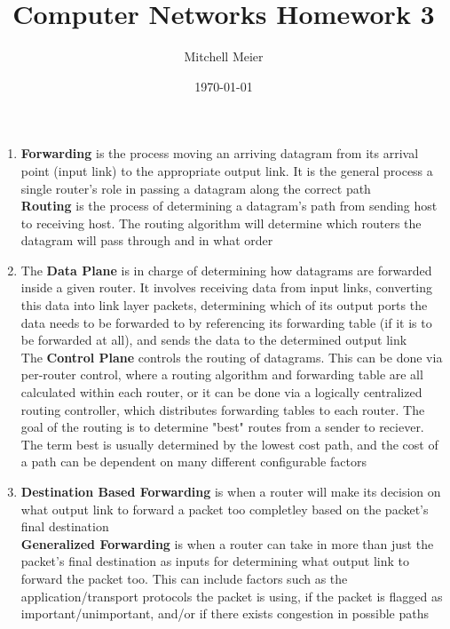 \documentclass[14pt]{article}
\title{Computer Networks Homework 3}
\author{Mitchell Meier}
\date{\today}
\newcommand{\bd}{\textbf}
\begin{document}
\maketitle

\begin{enumerate}

\item
\bd{Forwarding} is the process moving an arriving datagram from its arrival point (input link) to the appropriate output link. It is the general process a single router's role in passing a datagram along the correct path \\

\bd{Routing} is the process of determining a datagram's path from sending host to receiving host. The routing algorithm will determine which routers the datagram will pass through and in what order \\

\item
The \bd{Data Plane} is in charge of determining how datagrams are forwarded inside a given router. It involves receiving data from input links, converting this data into link layer packets, determining which of its output ports the data needs to be forwarded to by referencing its forwarding table (if it is to be forwarded at all), and sends the data to the determined output link \\

The \bd{Control Plane} controls the routing of datagrams. This can be done via per-router control, where a routing algorithm and forwarding table are all calculated within each router, or it can be done via a logically centralized routing controller, which distributes forwarding tables to each router. The goal of the routing is to determine "best" routes from a sender to reciever. The term best is usually determined by the lowest cost path, and the cost of a path can be dependent on many different configurable factors \\


\item
\bd{Destination Based Forwarding} is when a router will make its decision on what output link to forward a packet too completley based on the packet's final destination \\

\bd{Generalized Forwarding} is when a router can take in more than just the packet's final destination as inputs for determining what output link to forward the packet too. This can include factors such as the application/transport protocols the packet is using, if the packet is flagged as important/unimportant, and/or if there exists congestion in possible paths \\


\end{enumerate}
\end{document}
